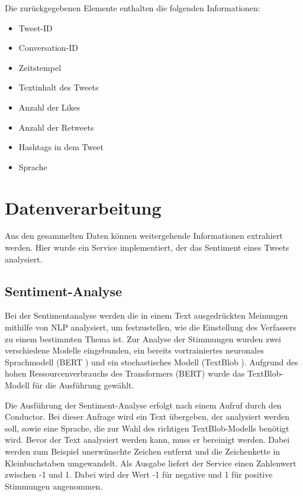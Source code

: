 \documentclass[conference]{IEEEtran}
\begin{document}
Die zurückgegebenen Elemente enthalten die folgenden Informationen:
\begin{itemize}
    \item Tweet-ID
    \item Conversation-ID
    \item Zeitstempel
    \item Textinhalt des Tweets
    \item Anzahl der Likes
    \item Anzahl der Retweets
    \item Hashtags in dem Tweet
    \item Sprache
\end{itemize}

\section{Datenverarbeitung}
Aus den gesammelten Daten können weitergehende Informationen extrahiert werden.
Hier wurde ein Service implementiert, der das Sentiment eines Tweets analysiert.

\subsection*{Sentiment-Analyse}
Bei der Sentimentanalyse werden die in einem Text ausgedrückten Meinungen mithilfe von NLP analysiert,
um festzustellen, wie die Einstellung des Verfassers zu einem bestimmten Thema ist.
Zur Analyse der Stimmungen wurden zwei verschiedene Modelle eingebunden,
ein bereits vortrainiertes neuronales Sprachmodell (BERT \cite{bert})
und ein stochastisches Modell (TextBlob \cite{textblob}).
Aufgrund des hohen Ressourcenverbrauchs des Transformers (BERT) wurde das TextBlob-Modell für die Ausführung gewählt.

Die Ausführung der Sentiment-Analyse erfolgt nach einem Aufruf durch den Conductor.
Bei dieser Anfrage wird ein Text übergeben, der analysiert werden soll,
sowie eine Sprache, die zur Wahl des richtigen TextBlob-Modells benötigt wird.
Bevor der Text analysiert werden kann, muss er bereinigt werden.
Dabei werden zum Beispiel unerwünschte Zeichen entfernt und die Zeichenkette in Kleinbuchstaben umgewandelt.
Als Ausgabe liefert der Service einen Zahlenwert zwischen -1 und 1.
Dabei wird der Wert -1 für negative und 1 für positive Stimmungen angenommen.
\end{document}
